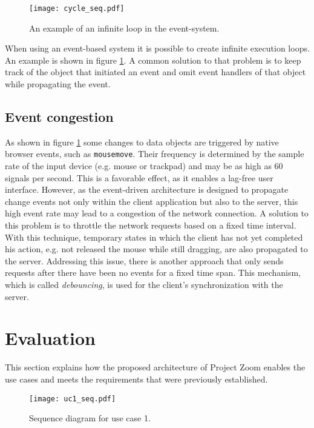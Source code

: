 \begin{figure}
\begin{center}
\texttt{[image: cycle\_seq.pdf]}
\caption{An example of an infinite loop in the event-system.}
\label{fig:eventcycle}
\end{center}
\end{figure}

When using an event-based system it is possible to create infinite execution loops. An example is shown in figure \ref{fig:eventcycle}. A common solution to that problem is to keep track of the object that initiated an event and omit event handlers of that object while propagating the event.

\section{Event congestion}
As shown in figure \ref{fig:eventcycle} some changes to data objects are triggered by native browser events, such as \texttt{mousemove}. Their frequency is determined by the sample rate of the input device (e.g. mouse or trackpad) and may be as high as 60 signals per second. This is a favorable effect, as it enables a lag-free user interface. However, as the event-driven architecture is designed to propagate change events not only within the client application but also to the server, this high event rate may lead to a congestion of the network connection. 
A solution to this problem is to throttle the network requests based on a fixed time interval. With this technique, temporary states in which the client has not yet completed his action, e.g. not released the mouse while still dragging, are also propagated to the server. Addressing this issue, there is another approach that only sends requests after there have been no events for a fixed time span. This mechanism, which is called \textit{debouncing}, is used for the client's synchronization with the server. \cite{Walsh_2012}


\chapter{Evaluation}

This section explains how the proposed architecture of Project Zoom enables the use cases and meets the requirements that were previously established. 

\begin{figure}
\begin{center}
\texttt{[image: uc1\_seq.pdf]}
\caption{Sequence diagram for use case 1.}
\label{fig:evaluc1}
\end{center}
\end{figure}


